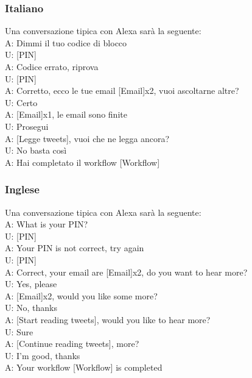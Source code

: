 \subsubsection{Italiano}
Una conversazione tipica con Alexa sarà la seguente: \\
\newline
A: Dimmi il tuo codice di blocco \\
U: [PIN] \\
A: Codice errato, riprova \\
U: [PIN] \\
A: Corretto, ecco le tue email [Email]x2, vuoi ascoltarne altre?\\
U: Certo\\
A: [Email]x1, le email sono finite\\
U: Prosegui\\
A: [Legge tweets], vuoi che ne legga ancora?\\
U: No basta così\\
A: Hai completato il workflow [Workflow]

\subsubsection{Inglese}
Una conversazione tipica con Alexa sarà la seguente:\\
\newline
A: What is your PIN? \\
U: [PIN] \\
A: Your PIN is not correct, try again \\
U: [PIN] \\
A: Correct, your email are [Email]x2, do you want to hear more?\\
U: Yes, please \\
A: [Email]x2, would you like some more? \\
U: No, thanks \\
A: [Start reading tweets], would you like to hear more?\\
U: Sure \\
A: [Continue reading tweets], more?\\
U: I'm good, thanks \\
A: Your workflow [Workflow] is completed


